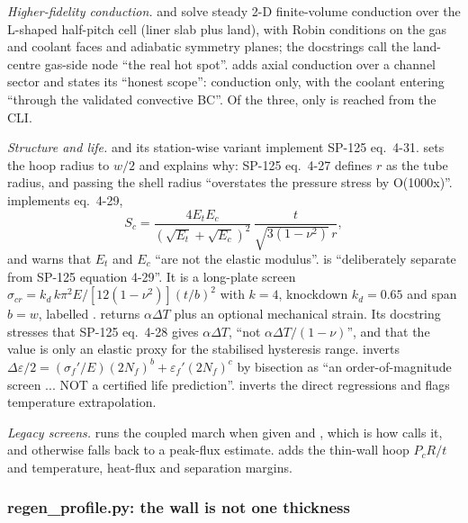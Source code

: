 \emph{Higher-fidelity conduction.}  and  solve steady 2-D finite-volume conduction over the L-shaped half-pitch cell (liner slab plus land), with Robin conditions on the gas and coolant faces and adiabatic symmetry planes; the docstrings call the land-centre gas-side node ``the real hot spot''.  adds axial conduction over a channel sector and states its ``honest scope'': conduction only, with the coolant entering ``through the validated convective BC''. Of the three, only  is reached from the CLI.

\emph{Structure and life.}  and its station-wise variant implement SP-125 eq.\ 4-31.  sets the hoop radius to $w/2$ and explains why: SP-125 eq.\ 4-27 defines $r$ as the tube radius, and passing the shell radius ``overstates the pressure stress by O(1000x)''.  implements eq.\ 4-29,
\[
S_c = \frac{4E_tE_c}{(\sqrt{E_t}+\sqrt{E_c})^2}\,\frac{t}{\sqrt{3(1-\nu^2)}\,r},
\]
and warns that $E_t$ and $E_c$ ``are not the elastic modulus''.  is ``deliberately separate from SP-125 equation 4-29''. It is a long-plate screen $\sigma_{cr} = k_d\,k\pi^2E/[12(1-\nu^2)](t/b)^2$ with $k = 4$, knockdown $k_d = 0.65$ and span $b = w$, labelled .  returns $\alpha\Delta T$ plus an optional mechanical strain. Its docstring stresses that SP-125 eq.\ 4-28 gives $\alpha\Delta T$, ``not $\alpha\Delta T/(1-\nu)$'', and that the value is only an elastic proxy for the stabilised hysteresis range.  inverts $\Delta\varepsilon/2 = (\sigma_f'/E)(2N_f)^b + \varepsilon_f'(2N_f)^c$ by bisection as ``an order-of-magnitude screen ... NOT a certified life prediction''.  inverts the direct regressions and flags temperature extrapolation.

\emph{Legacy screens.}  runs the coupled march when given  and , which is how  calls it, and otherwise falls back to a peak-flux estimate.  adds the thin-wall hoop $P_cR/t$ and temperature, heat-flux and separation margins.

\subsubsection*{regen\_profile.py: the wall is not one thickness}

